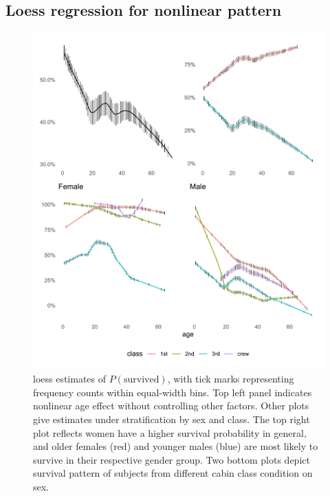 \documentclass[]{interact}
\theoremstyle{plain}%
\theoremstyle{definition}
\theoremstyle{remark}
\newenvironment{Shaded}{\begin{snugshade}}{\end{snugshade}}
\newcommand{\ConstantTok}[1]{\textcolor[rgb]{0.00,0.00,0.00}{#1}}
\newcommand{\NormalTok}[1]{#1}
\newcommand{\OtherTok}[1]{\textcolor[rgb]{0.56,0.35,0.01}{#1}}
\newcommand{\SpecialCharTok}[1]{\textcolor[rgb]{0.00,0.00,0.00}{#1}}
\begin{document}
\begin{Shaded}
\end{Shaded}

\hypertarget{loess-regression-for-nonlinear-pattern}{%
\subsection{Loess regression for nonlinear pattern}\label{loess-regression-for-nonlinear-pattern}}

\begin{figure}

{\centering \includegraphics{titanic-survival_files/figure-latex/loess-curve-1} 

}

\caption{loess estimates of \(P(\text{survived})\), with tick marks representing frequency counts within equal-width bins. Top left panel indicates nonlinear age effect without controlling other factors. Other plots give estimates under stratification by sex and class. The top right plot reflects women have a higher survival probability in general, and older females (red) and younger males (blue) are most likely to survive in their respective gender group. Two bottom plots depict survival pattern of subjects from different cabin class condition on sex.}\label{fig:loess-curve}
\end{figure}
\end{document}

